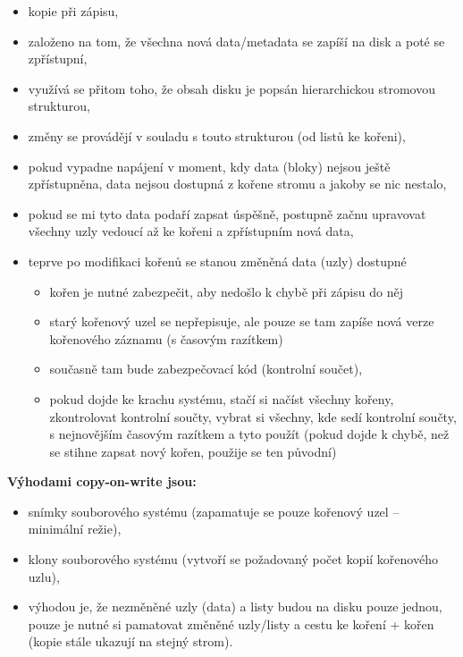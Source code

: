 \documentclass[a4paper, 11pt]{article}
\begin{document}
\begin{itemize}
    \item kopie při zápisu,
    \item založeno na tom, že všechna nová data/metadata se zapíší na disk a poté se zpřístupní,
    \item využívá se přitom toho, že obsah disku je popsán hierarchickou stromovou strukturou,
    \item změny se provádějí v souladu s touto strukturou (od listů ke kořeni),
    \item pokud vypadne napájení v moment, kdy data (bloky) nejsou ještě zpřístupněna, data nejsou dostupná z kořene stromu a jakoby se nic nestalo,
    \item pokud se mi tyto data podaří zapsat úspěšně, postupně začnu upravovat všechny uzly vedoucí až ke kořeni a zpřístupním nová data,
    \item teprve po modifikaci kořenů se stanou změněná data (uzly) dostupné
    \begin{itemize}
        \item kořen je nutné zabezpečit, aby nedošlo k chybě při zápisu do něj
        \item starý kořenový uzel se nepřepisuje, ale pouze se tam zapíše nová verze kořenového záznamu (s časovým razítkem)
        \item současně tam bude zabezpečovací kód (kontrolní součet),
        \item pokud dojde ke krachu systému, stačí si načíst všechny kořeny, zkontrolovat kontrolní součty, vybrat si všechny, kde sedí kontrolní součty, s nejnovějším časovým razítkem a tyto použít (pokud dojde k chybě, než se stihne zapsat nový kořen, použije se ten původní)
    \end{itemize}
\end{itemize}
 
\newpage
\textbf{Výhodami copy-on-write jsou:}
\begin{itemize}
    \item snímky souborového systému (zapamatuje se pouze kořenový uzel -- minimální režie),
    \item klony souborového systému (vytvoří se požadovaný počet kopií kořenového uzlu),
    \item výhodou je, že nezměněné uzly (data) a listy budou na disku pouze jednou, pouze je nutné si pamatovat změněné uzly/listy a cestu ke koření + kořen (kopie stále ukazují na stejný strom).
\end{itemize}
 
\end{document}
